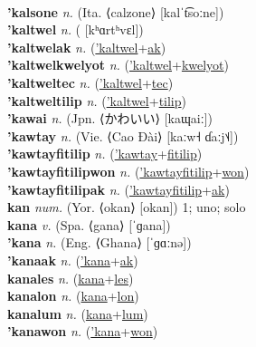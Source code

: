  \label{'kalcium} \\
\textbf{'kalsone} \textit{n.} (Ita. ⟨calzone⟩ [kalˈt͡soːne])
 \label{'kalsone} \\
\textbf{'kaltwel} \textit{n.} ( [kʰɑrtʰvɛl])
 \label{'kaltwel} \\
\textbf{'kaltwelak} \textit{n.} (\hyperref['kaltwel]{'kaltwel}+\hyperref[ak]{ak})
 \label{'kaltwelak} \\
\textbf{'kaltwelkwelyot} \textit{n.} (\hyperref['kaltwel]{'kaltwel}+\hyperref[kwelyot]{kwelyot})
 \label{'kaltwelkwelyot} \\
\textbf{'kaltweltec} \textit{n.} (\hyperref['kaltwel]{'kaltwel}+\hyperref[tec]{tec})
 \label{'kaltweltec} \\
\textbf{'kaltweltilip} \textit{n.} (\hyperref['kaltwel]{'kaltwel}+\hyperref[tilip]{tilip})
 \label{'kaltweltilip} \\
\textbf{'kawai} \textit{n.} (Jpn. ⟨かわいい⟩ [kaɰaiː])
 \label{'kawai} \\
\textbf{'kawtay} \textit{n.} (Vie. ⟨Cao Đài⟩ [kaːw˧ ɗaːj˦˨])
 \label{'kawtay} \\
\textbf{'kawtayfitilip} \textit{n.} (\hyperref['kawtay]{'kawtay}+\hyperref[fitilip]{fitilip})
 \label{'kawtayfitilip} \\
\textbf{'kawtayfitilipwon} \textit{n.} (\hyperref['kawtayfitilip]{'kawtayfitilip}+\hyperref[won]{won})
 \label{'kawtayfitilipwon} \\
\textbf{'kawtayfitilipak} \textit{n.} (\hyperref['kawtayfitilip]{'kawtayfitilip}+\hyperref[ak]{ak})
 \label{'kawtayfitilipak} \\
\textbf{kan} \textit{num.} (Yor. ⟨okan⟩ [okan])
1; uno; solo \label{kan} \\
\textbf{kana} \textit{v.} (Spa. ⟨gana⟩ [ˈɡana])
 \label{kana} \\
\textbf{'kana} \textit{n.} (Eng. ⟨Ghana⟩ [ˈɡɑːnə])
 \label{'kana} \\
\textbf{'kanaak} \textit{n.} (\hyperref['kana]{'kana}+\hyperref[ak]{ak})
 \label{'kanaak} \\
\textbf{kanales} \textit{n.} (\hyperref[kana]{kana}+\hyperref[les]{les})
 \label{kanales} \\
\textbf{kanalon} \textit{n.} (\hyperref[kana]{kana}+\hyperref[lon]{lon})
 \label{kanalon} \\
\textbf{kanalum} \textit{n.} (\hyperref[kana]{kana}+\hyperref[lum]{lum})
 \label{kanalum} \\
\textbf{'kanawon} \textit{n.} (\hyperref['kana]{'kana}+\hyperref[won]{won})
